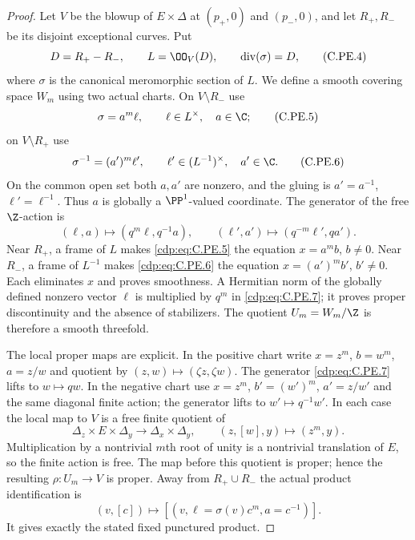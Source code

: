 \begin{proof}
Let $V$ be the blowup of $E\times\Delta$ at
$(p_+,0)$ and $(p_-,0)$, and let $R_+,R_-$ be its
disjoint exceptional curves. Put
\[
 D=R_+-R_-,\qquad L=\OO_V(D),\qquad
 \operatorname{div}(\sigma)=D,                         \tag{C.PE.4}\label{cdp:eq:C.PE.4}
\]
where $\sigma$ is the canonical meromorphic section of
$L$. We define a smooth covering space $W_m$ using two
actual charts. On $V\setminus R_-$ use
\[
 \sigma=a^m\ell,\qquad \ell\in L^\times,\quad a\in\C;
                                                               \tag{C.PE.5}\label{cdp:eq:C.PE.5}
\]
on $V\setminus R_+$ use
\[
 \sigma^{-1}=(a')^m\ell',\qquad
 \ell'\in(L^{-1})^\times,\quad a'\in\C.                 \tag{C.PE.6}\label{cdp:eq:C.PE.6}
\]
On the common open set both $a,a'$ are nonzero, and the
gluing is $a'=a^{-1}$, $\ell'=\ell^{-1}$. Thus $a$
is globally a $\PP^1$-valued coordinate. The generator
of the free $\Z$-action is
\[
 (\ell,a)\longmapsto(q^m\ell,q^{-1}a),\qquad
 (\ell',a')\longmapsto(q^{-m}\ell',qa').                 \tag{C.PE.7}\label{cdp:eq:C.PE.7}
\]
Near $R_+$, a frame of $L$ makes \eqref{cdp:eq:C.PE.5} the equation
$x=a^m b$, $b\ne0$. Near $R_-$, a frame of $L^{-1}$
makes \eqref{cdp:eq:C.PE.6} the equation $x=(a')^m b'$, $b'\ne0$.
Each eliminates $x$ and proves smoothness. A Hermitian
norm of the globally defined nonzero vector $\ell$ is
multiplied by $q^m$ in \eqref{cdp:eq:C.PE.7}; it proves proper
discontinuity and the absence of stabilizers. The
quotient $U_m=W_m/\Z$ is therefore a smooth threefold.

The local proper maps are explicit. In the positive
chart write $x=z^m$, $b=w^m$, $a=z/w$ and quotient
by $(z,w)\mapsto(\zeta z,\zeta w)$. The generator
\eqref{cdp:eq:C.PE.7} lifts to $w\mapsto qw$. In the negative
chart use $x=z^m$, $b'=(w')^m$, $a'=z/w'$ and the
same diagonal finite action; the generator lifts to
$w'\mapsto q^{-1}w'$. In each case the local map to
$V$ is a free finite quotient of
\[
 \Delta_z\times E\times\Delta_y
   \longrightarrow\Delta_x\times\Delta_y,\qquad
 (z,[w],y)\longmapsto(z^m,y).                           \tag{C.PE.8}\label{cdp:eq:C.PE.8}
\]
Multiplication by a nontrivial $m$th root of unity is a
nontrivial translation of $E$, so the finite action is
free. The map before this quotient is proper; hence
the resulting $\rho:U_m\to V$ is proper. Away from
$R_+\cup R_-$ the actual product identification is
\[
 (v,[c])\longmapsto[(v,\ell=\sigma(v)c^m,a=c^{-1})].     \tag{C.PE.9}\label{cdp:eq:C.PE.9}
\]
It gives exactly the stated fixed punctured product.


\end{proof}
